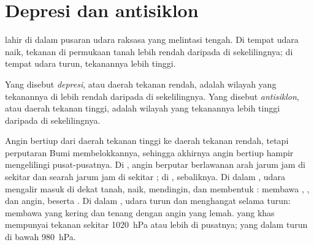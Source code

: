 \section{Depresi dan antisiklon}

 lahir di dalam pusaran udara raksasa yang melintasi  tengah.
Di tempat udara naik, tekanan di permukaan tanah lebih rendah daripada di
sekelilingnya; di tempat udara turun, tekanannya lebih tinggi.

\begin{definition}\label{def:g8:fronts-and-weather-maps:depression}
Yang disebut \emph{depresi}, atau daerah tekanan
rendah, adalah wilayah yang tekanannya di  lebih rendah
daripada di sekelilingnya. Yang disebut \emph{antisiklon},
atau daerah tekanan tinggi, adalah wilayah yang tekanannya lebih tinggi
daripada di sekelilingnya.
\end{definition}
\label{def:g8:fronts-and-weather-maps:anticyclone}

Angin bertiup dari daerah tekanan tinggi ke daerah tekanan rendah, tetapi
perputaran Bumi membelokkannya, sehingga akhirnya angin bertiup hampir
mengelilingi pusat-pusatnya. Di , angin berputar
berlawanan arah jarum jam di sekitar  dan searah jarum jam di
sekitar ; di , sebaliknya. Di dalam ,
udara mengalir masuk di dekat tanah, naik, mendingin, dan membentuk :
 membawa , , dan angin, beserta . Di dalam
, udara turun dan menghangat selama turun:  membawa
 yang kering dan tenang dengan angin yang lemah.  yang khas
mempunyai tekanan sekitar \qty{1020}{hPa} atau lebih di pusatnya; 
yang dalam turun di bawah \qty{980}{hPa}.

